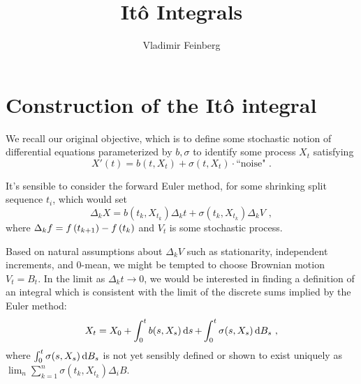 \documentclass{article}
\title{It\^{o} Integrals}
\author{Vladimir Feinberg}
\begin{document}
\maketitle

\section{Construction of the It\^{o} integral}

We recall our original objective, which is to define some stochastic notion of differential equations parameterized by \(b,\sigma\) to identify some process \(X_t\) satisfying
\[
X'(t) = b(t, X_t)+\sigma(t, X_t)\cdot \text{``noise"}\,\,.
\]

It's sensible to consider the forward Euler method, for some shrinking split sequence \(t_i\), which would set
\[
  \Delta_kX=b(t_k, X_{t_k})\Delta_k t+\sigma(t_k, X_{t_k})\Delta_k V\,\,,
  \]
  where \(\Delta_k f=f\left({t_{k+1}}\right)-f\left({t_{k}}\right)\) and \(V_t\) is some stochastic process.

  Based on natural assumptions about \(\Delta_k V\) such as stationarity, independent increments, and 0-mean, we might be tempted to choose Brownian motion \(V_t=B_t\). In the limit as \(\Delta_kt\rightarrow 0\), we would be interested in finding a definition of an integral which is consistent with the limit of the discrete sums implied by the Euler method:
  \[
X_t=X_0+\int_0^t b(s, X_s)\mathop{\mathrm{d} s }+\int_0^t\sigma(s, X_s)\mathop{\mathrm{d} B_s }\,\,,
\]
where \(\int_0^t\sigma(s, X_s)\mathop{\mathrm{d} B_s }\) is not yet sensibly defined or shown to exist uniquely as \(\lim_n\sum_{k=1}^n\sigma(t_k, X_{t_k})\Delta_i B\).
\end{document}
